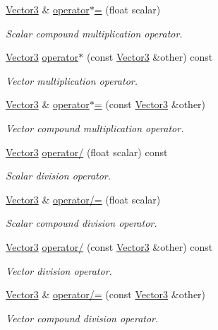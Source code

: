 \begin{DoxyCompactItemize}
\hyperlink{classchaos_1_1gfx_1_1_vector3}{Vector3} \& \hyperlink{classchaos_1_1gfx_1_1_vector3_abd751363ea77af4f9e673cf092f49473}{operator$\ast$=} (float scalar)
\begin{DoxyCompactList}\small\item\em Scalar compound multiplication operator. \end{DoxyCompactList}\item 
\hyperlink{classchaos_1_1gfx_1_1_vector3}{Vector3} \hyperlink{classchaos_1_1gfx_1_1_vector3_a8807a47431a2f3c1f8951c61cecd0023}{operator$\ast$} (const \hyperlink{classchaos_1_1gfx_1_1_vector3}{Vector3} \&other) const 
\begin{DoxyCompactList}\small\item\em Vector multiplication operator. \end{DoxyCompactList}\item 
\hyperlink{classchaos_1_1gfx_1_1_vector3}{Vector3} \& \hyperlink{classchaos_1_1gfx_1_1_vector3_a61771810dbf4a90472e2b24ca0945074}{operator$\ast$=} (const \hyperlink{classchaos_1_1gfx_1_1_vector3}{Vector3} \&other)
\begin{DoxyCompactList}\small\item\em Vector compound multiplication operator. \end{DoxyCompactList}\item 
\hyperlink{classchaos_1_1gfx_1_1_vector3}{Vector3} \hyperlink{classchaos_1_1gfx_1_1_vector3_abc909457ea9721592932f00502978886}{operator/} (float scalar) const 
\begin{DoxyCompactList}\small\item\em Scalar division operator. \end{DoxyCompactList}\item 
\hyperlink{classchaos_1_1gfx_1_1_vector3}{Vector3} \& \hyperlink{classchaos_1_1gfx_1_1_vector3_a9f61bd9beaabb1de857258d96d46c093}{operator/=} (float scalar)
\begin{DoxyCompactList}\small\item\em Scalar compound division operator. \end{DoxyCompactList}\item 
\hyperlink{classchaos_1_1gfx_1_1_vector3}{Vector3} \hyperlink{classchaos_1_1gfx_1_1_vector3_ab33c46a097c830aa204ccbda364811b0}{operator/} (const \hyperlink{classchaos_1_1gfx_1_1_vector3}{Vector3} \&other) const 
\begin{DoxyCompactList}\small\item\em Vector division operator. \end{DoxyCompactList}\item 
\hyperlink{classchaos_1_1gfx_1_1_vector3}{Vector3} \& \hyperlink{classchaos_1_1gfx_1_1_vector3_aadda7c9ca78db457342dd813016f1f53}{operator/=} (const \hyperlink{classchaos_1_1gfx_1_1_vector3}{Vector3} \&other)
\begin{DoxyCompactList}\small\item\em Vector compound division operator. \end{DoxyCompactList}\end{DoxyCompactItemize}
